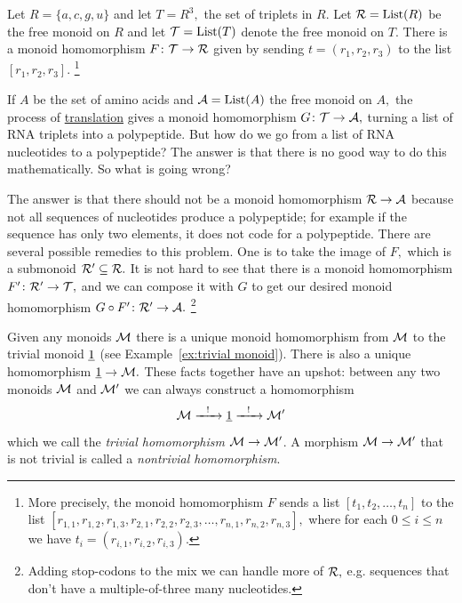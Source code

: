 \documentclass[CT4S-EN-RU]{subfiles}
\begin{document}
\begin{applicationENG}\label{app:RNA reader 1}
Let $R=\{a,c,g,u\}$ and let $T=R^3,$ the set of triplets in $R.$ Let $\mathcal{R}=\operatorname{List}(R)$ be the free monoid on $R$ and let $\mathcal{T}=\operatorname{List}(T)$ denote the free monoid on $T.$ There is a monoid homomorphism $F\colon\mathcal{T}\rightarrow\mathcal{R}$ given by sending $t=(r_1,r_2,r_3)$ to the list $[r_1,r_2,r_3].$
\footnote{More precisely, the monoid homomorphism $F$ sends a list $[t_1,t_2,\ldots,t_n]$ to the list $[r_{1,1},r_{1,2},r_{1,3},r_{2,1},r_{2,2},r_{2,3},\ldots,r_{n,1},r_{n,2},r_{n,3}],$ where for each $0\leq i\leq n$ we have $t_i=(r_{i,1},r_{i,2},r_{i,3}).$}

If $A$ be the set of amino acids and $\mathcal{A}=\operatorname{List}(A)$ the free monoid on $A,$ the process of \href{http://en.wikipedia.org/wiki/Translation_(biology)}{\text translation} gives a monoid homomorphism $G\colon\mathcal{T}\rightarrow\mathcal{A},$ turning a list of RNA triplets into a polypeptide. But how do we go from a list of RNA nucleotides to a polypeptide? The answer is that there is no good way to do this mathematically. So what is going wrong?

The answer is that there should not be a monoid homomorphism $\mathcal{R}\rightarrow\mathcal{A}$ because not all sequences of nucleotides produce a polypeptide; for example if the sequence has only two elements, it does not code for a polypeptide. There are several possible remedies to this problem. One is to take the image of $F,$ which is a submonoid $\mathcal{R}'\subseteq\mathcal{R}.$ It is not hard to see that there is a monoid homomorphism $F'\colon\mathcal{R}'\rightarrow\mathcal{T},$ and we can compose it with $G$ to get our desired monoid homomorphism $G\circ F'\colon\mathcal{R}'\rightarrow\mathcal{A}.$
\footnote{Adding stop-codons to the mix we can handle more of $\mathcal{R},$ e.g. sequences that don't have a multiple-of-three many nucleotides.}
\end{applicationENG}

\begin{applicationRUS}\label{app:RNA reader 1}
\end{applicationRUS}

\begin{exampleENG}\label{ex:trivial monoid homomorphism}
Given any monoids $\mathcal{M}$ there is a unique monoid homomorphism from $\mathcal{M}$ to the trivial monoid $\underline{1}$ (see Example~\ref{ex:trivial monoid}). There is also a unique homomorphism $\underline{1}\rightarrow\mathcal{M}.$ These facts together have an upshot: between any two monoids $\mathcal{M}$ and $\mathcal{M}'$ we can always construct a homomorphism
$$\mathcal{M}\xrightarrow{\ \ !\ \ }\underline{1}\xrightarrow{\ \ !\ \ }\mathcal{M}'$$
which we call the {\em trivial homomorphism $\mathcal{M}\rightarrow\mathcal{M}'$}. A morphism $\mathcal{M}\rightarrow\mathcal{M}'$ that is not trivial is called a {\em nontrivial homomorphism}.
\end{exampleENG}
\end{document}
